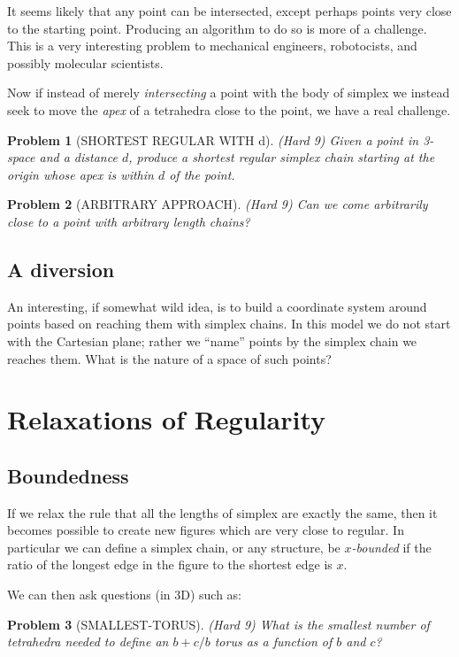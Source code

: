 \documentclass[11pt]{article}
\newtheorem{problem}{Problem}
\begin{document}
It seems likely that any point can be intersected, except perhaps points very close to the starting point. Producing an algorithm to do so
is more of a challenge. This is a very interesting problem to mechanical engineers, robotocists, and possibly molecular scientists.

Now if instead of merely {\em intersecting} a point with the body of simplex we instead seek to move the {\em apex} of a tetrahedra close
to the point, we have a real challenge.
\begin{problem}[SHORTEST REGULAR WITH d]
  (Hard 9) Given a point in 3-space and a distance $d$, produce a shortest regular simplex chain starting at the origin whose apex
  is within $d$ of the point.
\end{problem}

\begin{problem}[ARBITRARY APPROACH]
(Hard 9) Can we come arbitrarily close to a point with arbitrary length chains?
\end{problem}

\subsection{A diversion}
An interesting, if somewhat wild idea, is to build a coordinate system around points based on reaching them with simplex chains. In this model
we do not start with the Cartesian plane; rather we ``name'' points by the simplex chain we reaches them. What is the nature of a space
of such points? 



\section{Relaxations of Regularity}
\subsection{Boundedness}

If we relax the rule that all the lengths of simplex are exactly the same, then it becomes possible to create new figures which are
very close to regular. In particular we can define a simplex chain, or any structure, be {\em $x$-bounded} if the ratio of the longest edge
in the figure to the shortest edge is $x$.

We can then ask questions (in 3D) such as:

\begin{problem}[SMALLEST-TORUS]
(Hard 9)  What is the smallest number of tetrahedra needed to define an $b+c/b$ torus as a function of $b$ and $c$?
  \end{problem}
\end{document}
